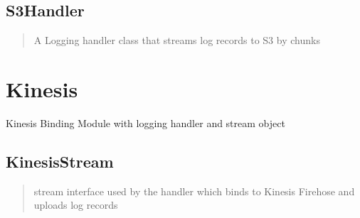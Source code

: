 \documentclass[letterpaper,10pt,english]{sphinxmanual}
\begin{document}
\section{S3Handler}
\label{\detokenize{s3/S3Handler:s3handler}}\label{\detokenize{s3/S3Handler::doc}}\begin{quote}

\begin{fulllineitems}
\label{\detokenize{s3/S3Handler:S3.S3Handler}}
A Logging handler class that streams log records to S3 by chunks

\end{fulllineitems}

\end{quote}


\chapter{Kinesis}
\label{\detokenize{kinesis/index:module-Kinesis}}\label{\detokenize{kinesis/index:kinesis}}\label{\detokenize{kinesis/index::doc}}
Kinesis Binding Module with logging handler and stream object


\section{KinesisStream}
\label{\detokenize{kinesis/KinesisStream:kinesisstream}}\label{\detokenize{kinesis/KinesisStream::doc}}\begin{quote}

\begin{fulllineitems}
\label{\detokenize{kinesis/KinesisStream:Kinesis.KinesisStream}}
stream interface used by the handler which binds to Kinesis Firehose and uploads log records

\end{fulllineitems}

\end{quote}
\end{document}
